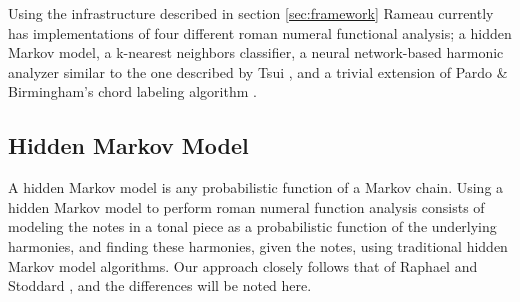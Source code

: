 Using the infrastructure described in section \ref{sec:framework}
Rameau currently has implementations of four different roman numeral
functional analysis; a hidden Markov model, a k-nearest neighbors
classifier, a neural network-based harmonic analyzer similar to the
one described by Tsui \cite{tsui02:harmonic}, and a trivial extension
of Pardo \& Birmingham's chord labeling algorithm
\cite{pardo.ea99:automated}.

\subsection{Hidden Markov Model}
\label{sec:hidden-markov-model}

A hidden Markov model is any probabilistic function of a Markov
chain. Using a hidden Markov model to perform roman numeral function
analysis consists of modeling the notes in a tonal piece as a
probabilistic function of the underlying harmonies, and finding these
harmonies, given the notes, using traditional hidden Markov model
algorithms. Our approach closely follows that of Raphael and Stoddard
\cite{raphael.ea03:harmonic}, and the differences will be noted here.



